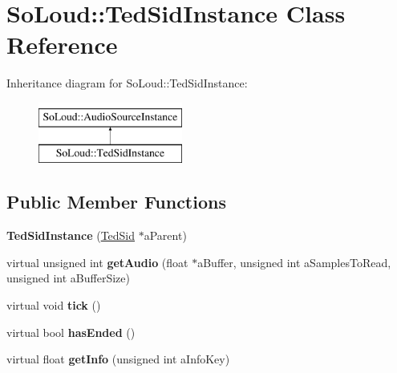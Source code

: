 \hypertarget{class_so_loud_1_1_ted_sid_instance}{}\section{So\+Loud\+::Ted\+Sid\+Instance Class Reference}
\label{class_so_loud_1_1_ted_sid_instance}
Inheritance diagram for So\+Loud\+::Ted\+Sid\+Instance\+:\begin{figure}[H]
\begin{center}
\leavevmode
\includegraphics[height=2.000000cm]{class_so_loud_1_1_ted_sid_instance}
\end{center}
\end{figure}
\subsection*{Public Member Functions}
\begin{DoxyCompactItemize}
\item 
\mbox{\label{class_so_loud_1_1_ted_sid_instance_a7bd55aaf5d486b3321742dc2f2da9873}} 
{\bfseries Ted\+Sid\+Instance} (\mbox{\hyperlink{class_so_loud_1_1_ted_sid}{Ted\+Sid}} $\ast$a\+Parent)
\item 
\mbox{\label{class_so_loud_1_1_ted_sid_instance_a5f6b5d7c54d26ea57bfe9967bc8d02d6}} 
virtual unsigned int {\bfseries get\+Audio} (float $\ast$a\+Buffer, unsigned int a\+Samples\+To\+Read, unsigned int a\+Buffer\+Size)
\item 
\mbox{\label{class_so_loud_1_1_ted_sid_instance_a78cd357b8eb43068d0cd4be7ee22a99b}} 
virtual void {\bfseries tick} ()
\item 
\mbox{\label{class_so_loud_1_1_ted_sid_instance_afebc8c2c781f8f36bf00c0e4ef911d97}} 
virtual bool {\bfseries has\+Ended} ()
\item 
\mbox{\label{class_so_loud_1_1_ted_sid_instance_af9d7ab9d6c912a38d13311987eb120ec}} 
virtual float {\bfseries get\+Info} (unsigned int a\+Info\+Key)
\end{DoxyCompactItemize}
